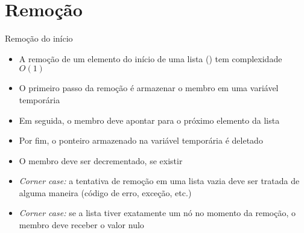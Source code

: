 \section{Remoção}

\begin{frame}[fragile]{Remoção do início}

    \begin{itemize}
        \item A remoção de um elemento do início de uma lista () tem 
        complexidade $O(1)$

        \item O primeiro passo da remoção é armazenar o membro  em uma 
            variável temporária

        \item Em seguida, o membro  deve apontar para o próximo elemento da
            lista

        \item Por fim, o ponteiro armazenado na variável temporária é deletado

        \item O membro  deve ser decrementado, se existir

        \item \textit{Corner case:} a tentativa de remoção em uma lista vazia deve ser tratada
            de alguma maneira (código de erro, exceção, etc.)

        \item \textit{Corner case:} se a lista tiver exatamente um nó no momento da remoção,
            o membro  deve receber o valor nulo
    \end{itemize}

\end{frame}

